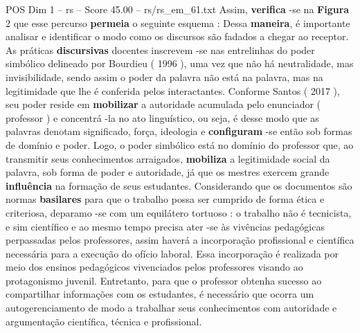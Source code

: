 \begin{textsample}{POS Dim 1 – rs – Score 45.00 – rs/rs\_em\_61.txt}
Assim, \textbf{verifica} -se na \textbf{Figura} 2 que esse percurso \textbf{permeia} o seguinte esquema : Dessa \textbf{maneira}, é importante analisar e identificar o modo como os discursos são fadados a chegar ao receptor.
As práticas \textbf{discursivas} docentes inscrevem -se nas entrelinhas do poder simbólico delineado por Bourdieu ( 1996 ), uma vez que não há neutralidade, mas invisibilidade, sendo assim o poder da palavra não está na palavra, mas na legitimidade que lhe é conferida pelos interactantes.
Conforme Santos ( 2017 ), seu poder reside em \textbf{mobilizar} a autoridade acumulada pelo enunciador ( professor ) e concentrá -la no ato linguístico, ou seja, é desse modo que as palavras denotam significado, força, ideologia e \textbf{configuram} -se então sob formas de domínio e poder.
Logo, o poder simbólico está no domínio do professor que, ao transmitir seus conhecimentos arraigados, \textbf{mobiliza} a legitimidade social da palavra, sob forma de poder e autoridade, já que os mestres exercem grande \textbf{influência} na formação de seus estudantes.
Considerando que os documentos são normas \textbf{basilares} para que o trabalho possa ser cumprido de forma ética e criteriosa, deparamo -se com um equilátero tortuoso : o trabalho não é tecnicista, e sim científico e ao mesmo tempo precisa ater -se às vivências pedagógicas perpassadas pelos professores, assim haverá a incorporação profissional e científica necessária para a execução do ofício laboral.
Essa incorporação é realizada por meio dos ensinos pedagógicos vivenciados pelos professores visando ao protagonismo juvenil.
Entretanto, para que o professor obtenha sucesso ao compartilhar informações com os estudantes, é necessário que ocorra um autogerenciamento de modo a trabalhar seus conhecimentos com autoridade e argumentação científica, técnica e profissional.

\end{textsample}
